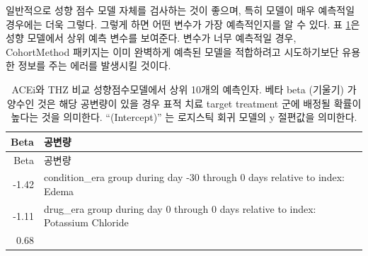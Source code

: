 \documentclass[10.5pt]{book}
\theoremstyle{definition}
\theoremstyle{definition}
\theoremstyle{definition}
\theoremstyle{remark}
\begin{document}
일반적으로 성향 점수 모델 자체를 검사하는 것이 좋으며, 특히 모델이 매우
예측적일 경우에는 더욱 그렇다. 그렇게 하면 어떤 변수가 가장 예측적인지를
알 수 있다. 표 \ref{tab:psModel}은 성향 모델에서 상위 예측 변수를
보여준다. 변수가 너무 예측적일 경우, CohortMethod 패키지는 이미 완벽하게
예측된 모델을 적합하려고 시도하기보단 유용한 정보를 주는 에러를 발생시킬
것이다. 

\begin{longtable}[]{@{}rl@{}}
\caption{\label{tab:psModel} ACEi와 THZ 비교 성향점수모델에서 상위 10개의
예측인자. 베타 beta (기울기) 가 양수인 것은 해당 공변량이 있을 경우 표적
치료 target treatment 군에 배정될 확률이 높다는 것을 의미한다.
``(Intercept)'' 는 로지스틱 회귀 모델의 y 절편값을
의미한다.}\tabularnewline
\toprule
\begin{minipage}[b]{0.07\columnwidth}\raggedleft\strut
Beta\strut
\end{minipage} & \begin{minipage}[b]{0.87\columnwidth}\raggedright\strut
공변량\strut
\end{minipage}\tabularnewline
\midrule
\endfirsthead
\toprule
\begin{minipage}[b]{0.07\columnwidth}\raggedleft\strut
Beta\strut
\end{minipage} & \begin{minipage}[b]{0.87\columnwidth}\raggedright\strut
공변량\strut
\end{minipage}\tabularnewline
\midrule
\endhead
\begin{minipage}[t]{0.07\columnwidth}\raggedleft\strut
-1.42\strut
\end{minipage} & \begin{minipage}[t]{0.87\columnwidth}\raggedright\strut
condition\_era group during day -30 through 0 days relative to index:
Edema\strut
\end{minipage}\tabularnewline
\begin{minipage}[t]{0.07\columnwidth}\raggedleft\strut
-1.11\strut
\end{minipage} & \begin{minipage}[t]{0.87\columnwidth}\raggedright\strut
drug\_era group during day 0 through 0 days relative to index: Potassium
Chloride\strut
\end{minipage}\tabularnewline
\begin{minipage}[t]{0.07\columnwidth}\raggedleft\strut
0.68\strut
\end{minipage} & \begin{minipage}[t]{0.87\columnwidth}\raggedright\strut

\end{minipage}
\end{longtable}
\end{document}
